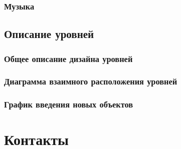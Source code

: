 \documentclass{article}
\begin{document}
	\subsubsection{Музыка}
	
	\subsection{Описание уровней}
	
	\subsubsection{Общее описание дизайна уровней}
	
	\subsubsection{Диаграмма взаимного расположения уровней}
	
	\subsubsection{График введения новых объектов}
	
	\newpage
	\section{Контакты}
	
	\newpage
	
\end{document}
